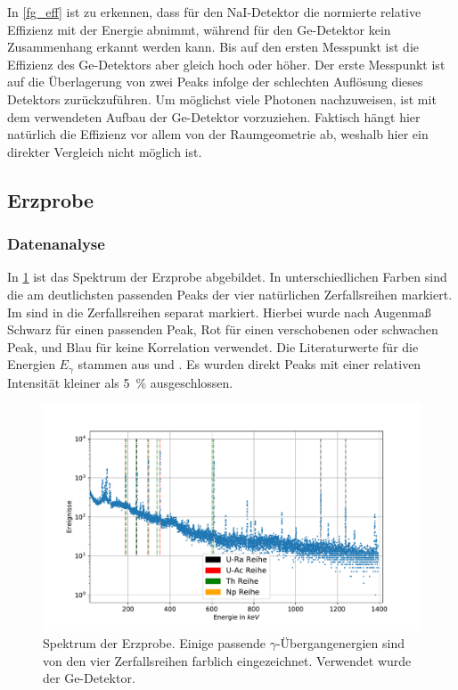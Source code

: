 \documentclass[
	a4paper,
	12pt,
	pagesize,
	ngerman
]{scrartcl}
\begin{document}
In \cref{fg_eff} ist zu erkennen, dass für den NaI-Detektor die normierte relative Effizienz mit der Energie abnimmt, während für den Ge-Detektor kein Zusammenhang erkannt werden kann.
Bis auf den ersten Messpunkt ist die Effizienz des Ge-Detektors aber gleich hoch oder höher.
Der erste Messpunkt ist auf die Überlagerung von zwei Peaks infolge der schlechten Auflösung dieses Detektors zurückzuführen.
Um möglichst viele Photonen nachzuweisen, ist mit dem verwendeten Aufbau der Ge-Detektor vorzuziehen.
Faktisch hängt hier natürlich die Effizienz vor allem von der Raumgeometrie ab, weshalb hier ein direkter Vergleich nicht möglich ist.

\subsection{Erzprobe}
\subsubsection{Datenanalyse}
	In \cref{fg_erz} ist das Spektrum der Erzprobe abgebildet.
	In unterschiedlichen Farben sind die am deutlichsten passenden Peaks der vier natürlichen Zerfallsreihen markiert.
	Im  sind in  die Zerfallsreihen separat markiert.
	Hierbei wurde nach Augenmaß Schwarz für einen passenden Peak, Rot für einen verschobenen oder schwachen Peak, und Blau für keine Korrelation verwendet.
	Die Literaturwerte für die Energien $E_\gamma$ stammen aus \cite{erze1} und \cite{erze2}.
	Es wurden direkt Peaks mit einer relativen Intensität kleiner als \SI{5}{\percent} ausgeschlossen.

	\begin{figure}[H]
			\includegraphics[width= 1 \linewidth]{img/erz_alles}
			\caption{
			Spektrum der Erzprobe. Einige passende $\gamma$-Übergangenergien sind von den vier Zerfallsreihen farblich eingezeichnet. Verwendet wurde der Ge-Detektor.
			}
			\label{fg_erz}
	\end{figure}
\end{document}
